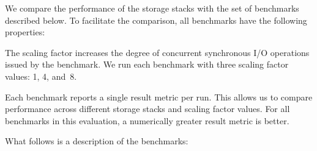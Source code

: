 \documentclass[12pt,a4paper,twoside]{book}
\begin{document}
We compare the performance of the storage stacks with the set of benchmarks described below.
To facilitate the comparison, all benchmarks have the following properties:
\begin{description}[noitemsep,leftmargin=1.5cm,labelindent=1cm]
    \item[Scaling factor] The scaling factor increases the degree of concurrent synchronous I/O operations issued by the benchmark.
        We run each benchmark with three scaling factor values: 1, 4, and~8.
    \item[Result Metric] Each benchmark reports a single result metric per run.
        This allows us to compare performance across different storage stacks and scaling factor values.
        For all benchmarks in this evaluation, a numerically greater result metric is better.
\end{description}
What follows is a description of the benchmarks:
\end{document}
